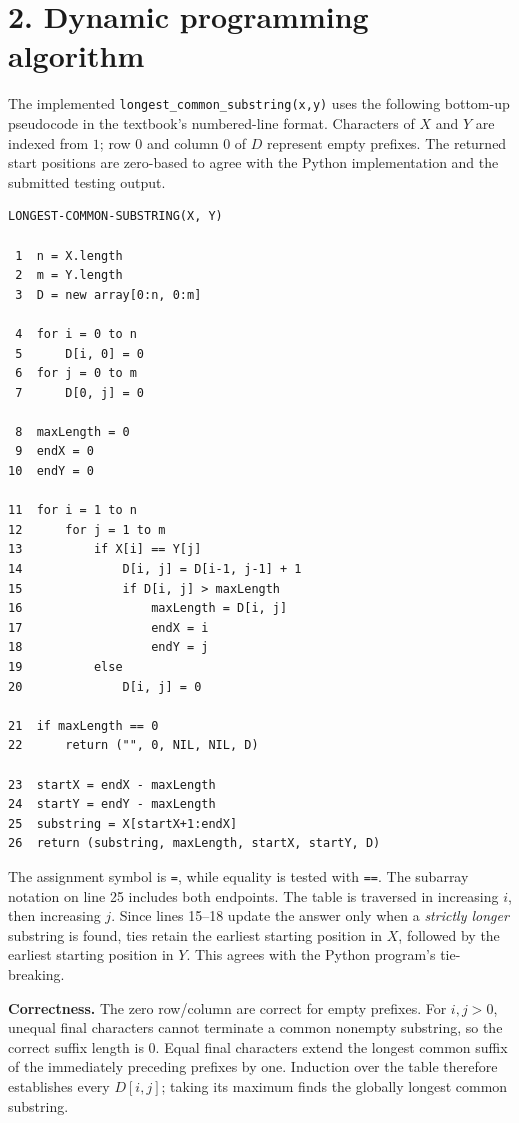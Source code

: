 \documentclass[11pt,a4paper]{article}
\newcommand{\code}[1]{\texttt{#1}}
\begin{document}
\section*{2. Dynamic programming algorithm}
The implemented \code{longest\_common\_substring(x,y)} uses the following
bottom-up pseudocode in the textbook's numbered-line format. Characters of
$X$ and $Y$ are indexed from $1$; row $0$ and column $0$ of $D$ represent
empty prefixes. The returned start positions are zero-based to agree with
the Python implementation and the submitted testing output.

\begingroup\small
\begin{verbatim}
LONGEST-COMMON-SUBSTRING(X, Y)

 1  n = X.length
 2  m = Y.length
 3  D = new array[0:n, 0:m]

 4  for i = 0 to n
 5      D[i, 0] = 0
 6  for j = 0 to m
 7      D[0, j] = 0

 8  maxLength = 0
 9  endX = 0
10  endY = 0

11  for i = 1 to n
12      for j = 1 to m
13          if X[i] == Y[j]
14              D[i, j] = D[i-1, j-1] + 1
15              if D[i, j] > maxLength
16                  maxLength = D[i, j]
17                  endX = i
18                  endY = j
19          else
20              D[i, j] = 0

21  if maxLength == 0
22      return ("", 0, NIL, NIL, D)

23  startX = endX - maxLength
24  startY = endY - maxLength
25  substring = X[startX+1:endX]
26  return (substring, maxLength, startX, startY, D)
\end{verbatim}
\endgroup

The assignment symbol is \code{=}, while equality is tested with
\code{==}. The subarray notation on line 25 includes both endpoints.
The table is traversed in increasing $i$, then increasing $j$. Since lines
15--18 update the answer only when a \emph{strictly longer} substring is found,
ties retain the earliest starting position in $X$, followed by the earliest
starting position in $Y$. This agrees with the Python program's tie-breaking.

\textbf{Correctness.} The zero row/column are correct for empty prefixes.
For $i,j>0$, unequal final characters cannot terminate a common nonempty
substring, so the correct suffix length is $0$. Equal final characters extend
the longest common suffix of the immediately preceding prefixes by one.
Induction over the table therefore establishes every $D[i,j]$; taking its
maximum finds the globally longest common substring.
\end{document}
